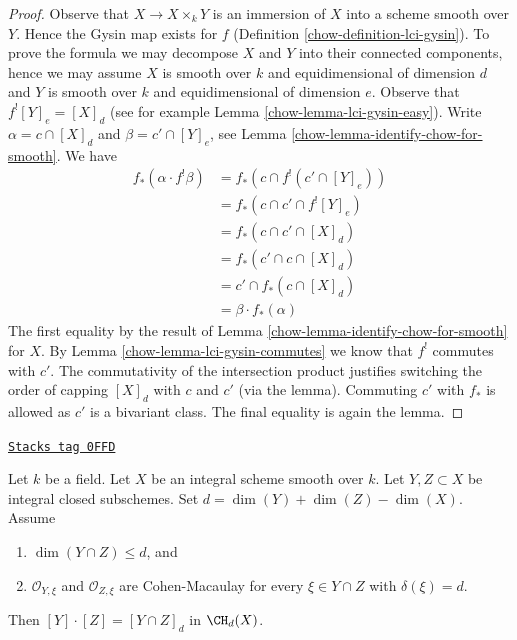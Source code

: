 \begin{proof}

Observe that $X \to X \times_k Y$ is an immersion of $X$ into a scheme
smooth over $Y$. Hence the Gysin map exists for $f$
(Definition \ref{chow-definition-lci-gysin}).
To prove the formula we may decompose $X$ and $Y$ into their
connected components, hence we may assume $X$ is smooth over $k$
and equidimensional of dimension $d$ and $Y$ is smooth over $k$
and equidimensional of dimension $e$. Observe that
$f^![Y]_e = [X]_d$ (see for example Lemma \ref{chow-lemma-lci-gysin-easy}).
Write $\alpha = c \cap [X]_d$ and $\beta = c' \cap [Y]_e$,
see Lemma \ref{chow-lemma-identify-chow-for-smooth}. We have
\begin{align*}
f_*(\alpha \cdot f^!\beta)
& =
f_*(c \cap f^!(c' \cap [Y]_e)) \\
& =
f_*(c \cap c' \cap f^![Y]_e) \\
& =
f_*(c \cap c' \cap [X]_d) \\
& =
f_*(c' \cap c \cap [X]_d) \\
& =
c' \cap f_*(c \cap [X]_d) \\
& =
\beta \cdot f_*(\alpha)
\end{align*}
The first equality by the result of Lemma \ref{chow-lemma-identify-chow-for-smooth}
for $X$. By Lemma \ref{chow-lemma-lci-gysin-commutes} we know that $f^!$
commutes with $c'$. The commutativity of the intersection
product justifies switching the order of capping $[X]_d$ with $c$ and $c'$
(via the lemma). Commuting $c'$ with $f_*$ is allowed as $c'$
is a bivariant class. The final equality is again the lemma.
\end{proof}

\begin{lemma}
\label{chow-lemma-intersect-properly}
\href{https://stacks.math.columbia.edu/tag/0FFD}{\texttt{Stacks tag 0FFD}}

Let $k$ be a field. Let $X$ be an integral scheme smooth over $k$.
Let $Y, Z \subset X$ be integral closed subschemes. Set
$d = \dim(Y) + \dim(Z) - \dim(X)$. Assume
\begin{enumerate}
\item $\dim(Y \cap Z) \leq d$, and
\item $\mathcal{O}_{Y, \xi}$ and $\mathcal{O}_{Z, \xi}$
are Cohen-Macaulay for every $\xi \in Y \cap Z$ with
$\delta(\xi) = d$.
\end{enumerate}
Then $[Y] \cdot [Z] = [Y \cap Z]_d$ in $\CH_d(X)$.
\end{lemma}

